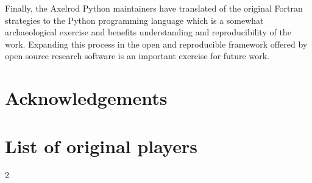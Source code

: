 \documentclass{article}
\begin{document}
Finally, the Axelrod Python maintainers
have translated of the
original Fortran strategies to the Python
programming language which is a somewhat archaeological exercise and benefits
understanding and reproducibility of the work. Expanding this process in the open
and reproducible framework offered by open source research software is an
important exercise for future work. 

\section*{Acknowledgements}







\appendix

\section{List of original players}\label{app:list_of_original_players}


\begin{multicols}{2}
    \begin{enumerate}
            
    \end{enumerate}
\end{multicols}
\end{document}
